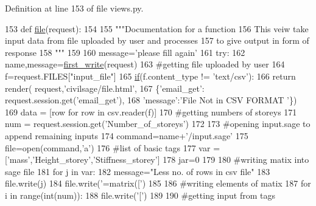 Definition at line 153 of file views.\+py.


\begin{DoxyCode}
153 \textcolor{keyword}{def }\hyperlink{a00036_a32de127956738677913352a2db84ecdb}{file}(request):
154 
155     \textcolor{stringliteral}{"""Documentation for a function}
156 \textcolor{stringliteral}{    This veiw take input data from file uploaded by user and processes}
157 \textcolor{stringliteral}{    to give output in form of response}
158 \textcolor{stringliteral}{    """}
159 
160     message=\textcolor{stringliteral}{'please fill again'}
161     \textcolor{keywordflow}{try}:
162         name,message=\hyperlink{a00036_ad9397359f36a9df37e0aa43f3be032a3}{first\_write}(request)
163         \textcolor{comment}{#getting file uploaded by user}
164         f=request.FILES[\textcolor{stringliteral}{"input\_file"}]
165         \hyperlink{a00029_ac2d69f5011896c6ed4a54e0dd36f6334}{if}(f.content\_type != \textcolor{stringliteral}{'text/csv'}):
166             \textcolor{keywordflow}{return} render( request,\textcolor{stringliteral}{'civilsage/file.html'},
167             \{\textcolor{stringliteral}{'email\_get'}: request.session.get(\textcolor{stringliteral}{'email\_get'}),
168             \textcolor{stringliteral}{'message'}:\textcolor{stringliteral}{'File Not in CSV FORMAT '}\})
169         data = [row \textcolor{keywordflow}{for} row \textcolor{keywordflow}{in} csv.reader(f)]
170         \textcolor{comment}{#getting numbers of storeys}
171         num = request.session.get(\textcolor{stringliteral}{'Number\_of\_storeys'})
172 
173         \textcolor{comment}{#opening input.sage to append remaining inputs}
174         command=name+\textcolor{stringliteral}{'/input.sage'}
175         file=open(command,\textcolor{stringliteral}{'a'})
176         \textcolor{comment}{#list of basic tags}
177         var = [\textcolor{stringliteral}{'mass'},\textcolor{stringliteral}{'Height\_storey'},\textcolor{stringliteral}{'Stiffness\_storey'}]
178         jar=0
179 
180         \textcolor{comment}{#writing matix into sage file}
181         \textcolor{keywordflow}{for} j \textcolor{keywordflow}{in} var:
182             message=\textcolor{stringliteral}{"Less no. of rows in csv file"}
183             file.write(j)
184             file.write(\textcolor{stringliteral}{'=matrix(['})
185 
186             \textcolor{comment}{#writing elements of matix}
187             \textcolor{keywordflow}{for} i \textcolor{keywordflow}{in} range(int(num)):
188                 file.write(\textcolor{stringliteral}{'['})
189 
190                 \textcolor{comment}{#getting input from tags}

\end{DoxyCode}
